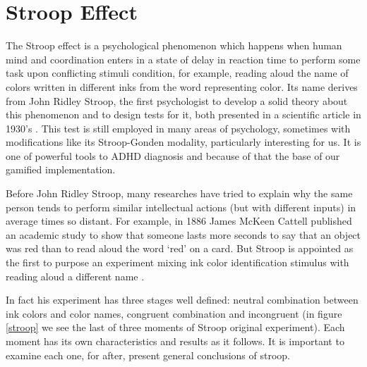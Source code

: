\section{Stroop Effect}



The Stroop effect is a psychological phenomenon which happens when human mind and coordination enters in a state of delay in reaction time to perform some task upon conflicting stimuli  condition, for example, reading aloud the name of colors written in different inks from the word representing color. Its name derives from John Ridley Stroop, the first psychologist to develop a solid theory about this phenomenon and to design tests for it, both presented in a scientific article in 1930's \citep{Studies1935}. This test is still employed in many areas of psychology, sometimes with modifications like its Stroop-Gonden modality, particularly interesting for us. It is one of powerful tools to ADHD diagnosis and because of that the base of our gamified implementation.



Before John Ridley Stroop, many researches have tried to explain why the same person tends to perform similar intellectual actions (but with different inputs) in average times so distant. For example, in 1886 James McKeen Cattell published an academic study to show that someone lasts more seconds to say that an object was red than to read aloud the word `red' on a card. But Stroop is appointed as the first to purpose an experiment mixing ink color identification stimulus with reading aloud a different name \citep{macleod}. 



In fact his experiment has three stages well defined: neutral combination between ink colors and color names, congruent combination and incongruent (in figure \ref{stroop} we see the last of three moments of Stroop original experiment). Each moment has its own characteristics and results as it follows. It is important to examine each one, for after, present general conclusions of stroop. 



